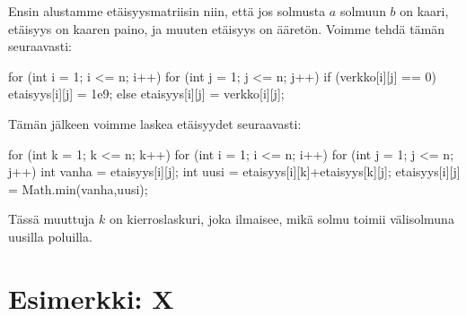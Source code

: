 Ensin alustamme etäisyysmatriisin niin,
että jos solmusta $a$ solmuun $b$ on kaari,
etäisyys on kaaren paino, ja muuten etäisyys on ääretön.
Voimme tehdä tämän seuraavasti:

\begin{code}
for (int i = 1; i <= n; i++) {
    for (int j = 1; j <= n; j++) {
        if (verkko[i][j] == 0) {
            etaisyys[i][j] = 1e9;
        } else {
            etaisyys[i][j] = verkko[i][j];
        }
    }
}
\end{code}

Tämän jälkeen voimme laskea etäisyydet seuraavasti:

\begin{code}
for (int k = 1; k <= n; k++) {
    for (int i = 1; i <= n; i++) {
        for (int j = 1; j <= n; j++) {
            int vanha = etaisyys[i][j];
            int uusi = etaisyys[i][k]+etaisyys[k][j];
            etaisyys[i][j] = Math.min(vanha,uusi);
        }
    }
}
\end{code}

Tässä muuttuja $k$ on kierroslaskuri, joka ilmaisee, mikä solmu toimii
välisolmuna uusilla poluilla.

\section{Esimerkki: X}